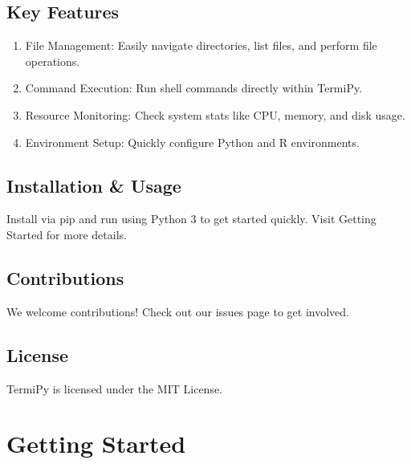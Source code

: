 \documentclass[
  letterpaper,
  DIV=11,
  numbers=noendperiod]{scrreprt}
\providecommand{\tightlist}{%
  \setlength{\itemsep}{0pt}\setlength{\parskip}{0pt}}\usepackage{longtable,booktabs,array}
\begin{document}
\section*{Key Features}\label{key-features}


\begin{enumerate}
\def\labelenumi{\arabic{enumi}.}
\tightlist
\item
  File Management: Easily navigate directories, list files, and perform
  file operations.
\item
  Command Execution: Run shell commands directly within TermiPy.
\item
  Resource Monitoring: Check system stats like CPU, memory, and disk
  usage.
\item
  Environment Setup: Quickly configure Python and R environments.
\end{enumerate}

\section*{Installation \& Usage}\label{installation-usage}


Install via pip and run using Python 3 to get started quickly. Visit
Getting Started for more details.

\section*{Contributions}\label{contributions}


We welcome contributions! Check out our issues page to get involved.

\section*{License}\label{license}


TermiPy is licensed under the MIT License.


\chapter*{Getting Started}\label{getting-started}
\end{document}
